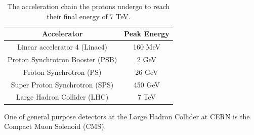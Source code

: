 \begin{table}[h!]
	\centering
	\begin{tabular}{c|c}
		Accelerator & Peak Energy \\
		\hline
		\hline
		Linear accelerator 4 (Linac4) & 160 MeV \\
		\hline
		Proton Synchrotron Booster (PSB) & 2 GeV \\
		\hline
		Proton Synchrotron (PS) & 26 GeV \\
		\hline
		Super Proton Synchrotron (SPS) & 450 GeV \\
		\hline
		Large Hadron Collider (LHC) & 7 TeV \\
	\end{tabular}
	\caption{The acceleration chain the protons undergo to reach their final energy of 7 TeV.}
	\label{tab:preaccelerators}
\end{table}

\color{red}{Entering the LHC, they live happily forever after until they are brutally crushed into each other and die of quantum mechanics.}\color{black}




One of general purpose detectors at the Large Hadron Collider at CERN is the Compact Muon Solenoid (CMS).
